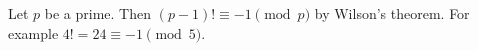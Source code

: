 Let $p$ be a prime.
Then $(p - 1)! \equiv -1 \pmod{p}$ by Wilson's theorem.
For example $4! = 24 \equiv -1 \pmod{5}$.